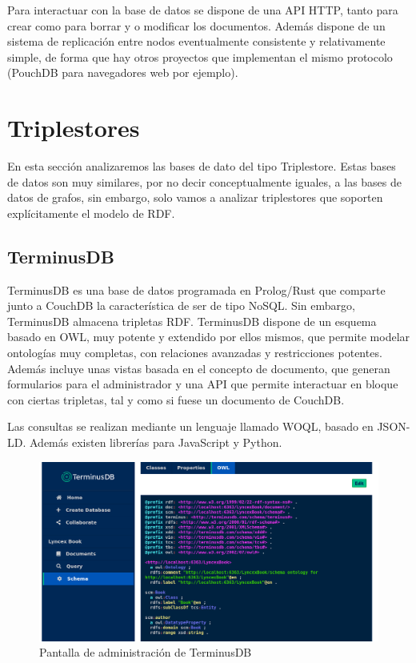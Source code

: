 \documentclass[12pt]{report} %
\begin{document}
Para interactuar con la base de datos se dispone de una API HTTP, tanto para crear como para borrar y o modificar los documentos.
Además dispone de un sistema de replicación entre nodos eventualmente consistente y relativamente simple, de forma que hay otros proyectos que implementan el mismo protocolo (PouchDB para navegadores web por ejemplo).

\section{Triplestores}

En esta sección analizaremos las bases de dato del tipo Triplestore. Estas bases de datos son muy similares, por no decir conceptualmente iguales, a las bases de datos de grafos, sin embargo, solo vamos a analizar triplestores que soporten explícitamente el modelo de RDF.

\subsection{TerminusDB}
TerminusDB es una base de datos programada en Prolog/Rust que comparte junto a CouchDB la característica de ser de tipo NoSQL.\cite{terminusdb}
Sin embargo, TerminusDB almacena tripletas RDF.
TerminusDB dispone de un esquema basado en OWL, muy potente y extendido por ellos mismos, que permite modelar ontologías muy completas, con relaciones avanzadas y restricciones potentes. Además incluye unas vistas basada en el concepto de documento, que generan formularios para el administrador y una API que permite interactuar en bloque con ciertas tripletas, tal y como si fuese un documento de CouchDB.

Las consultas se realizan mediante un lenguaje llamado WOQL, basado en JSON-LD. Además existen librerías para JavaScript y Python.

\begin{figure}[h]
    \centering
    \includegraphics[width=\textwidth]{terminusdb.png}
    \caption{Pantalla de administración de TerminusDB}
    \label{fig:terminusdb}
\end{figure}
\end{document}
